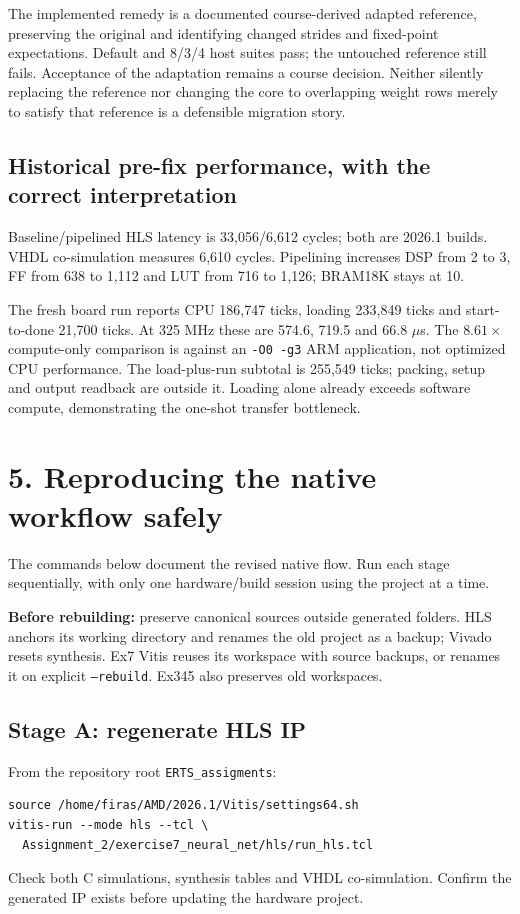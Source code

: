\documentclass[11pt,a4paper]{article}
\begin{document}
The implemented remedy is a documented course-derived adapted reference,
preserving the original and identifying changed strides and fixed-point
expectations. Default and 8/3/4 host suites pass; the untouched reference still
fails. Acceptance of the adaptation remains a course decision.
Neither silently replacing the reference nor changing the core to overlapping
weight rows merely to satisfy that reference is a defensible migration story.

\subsection*{Historical pre-fix performance, with the correct interpretation}
Baseline/pipelined HLS latency is 33,056/6,612 cycles; both are 2026.1 builds.
VHDL co-simulation measures 6,610 cycles. Pipelining increases DSP from 2 to 3,
FF from 638 to 1,112 and LUT from 716 to 1,126; BRAM18K stays at 10.

The fresh board run reports CPU 186,747 ticks, loading 233,849 ticks and
start-to-done 21,700 ticks. At 325 MHz these are 574.6, 719.5 and 66.8 $\mu$s.
The $8.61\times$ compute-only comparison is against an \texttt{-O0 -g3} ARM
application, not optimized CPU performance. The load-plus-run subtotal is
255,549 ticks; packing, setup and output readback are outside it. Loading alone
already exceeds software compute, demonstrating the one-shot transfer bottleneck.

\newpage
\section*{5. Reproducing the native workflow safely}
The commands below document the revised native flow. Run each stage sequentially, with
only one hardware/build session using the project at a time.

\textbf{Before rebuilding:} preserve canonical sources outside generated folders.
HLS anchors its working directory and renames the old project as a backup;
Vivado resets synthesis. Ex7 Vitis reuses its workspace with source backups, or
renames it on explicit \texttt{--rebuild}. Ex345 also preserves old workspaces.

\subsection*{Stage A: regenerate HLS IP}
From the repository root \texttt{ERTS\_assigments}:
\begin{lstlisting}
source /home/firas/AMD/2026.1/Vitis/settings64.sh
vitis-run --mode hls --tcl \
  Assignment_2/exercise7_neural_net/hls/run_hls.tcl
\end{lstlisting}
Check both C simulations, synthesis tables and VHDL co-simulation. Confirm the
generated IP exists before updating the hardware project.
\end{document}

